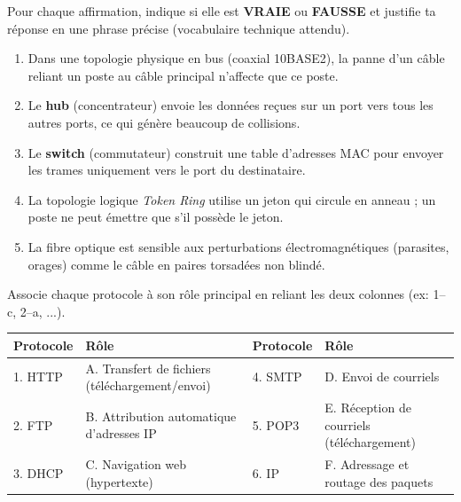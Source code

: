 \documentclass[11pt]{article}
\begin{document}
\begin{exercice}
Pour chaque affirmation, indique si elle est \textbf{VRAIE} ou \textbf{FAUSSE} et justifie ta réponse en une phrase précise (vocabulaire technique attendu).

\begin{enumerate}
    \item Dans une topologie physique en bus (coaxial 10BASE2), la panne d'un câble reliant un poste au câble principal n'affecte que ce poste.
    \item Le \textbf{hub} (concentrateur) envoie les données reçues sur un port vers tous les autres ports, ce qui génère beaucoup de collisions.
    \item Le \textbf{switch} (commutateur) construit une table d'adresses MAC pour envoyer les trames uniquement vers le port du destinataire.
    \item La topologie logique \emph{Token Ring} utilise un jeton qui circule en anneau ; un poste ne peut émettre que s'il possède le jeton.
    \item La fibre optique est sensible aux perturbations électromagnétiques (parasites, orages) comme le câble en paires torsadées non blindé.
\end{enumerate}
\end{exercice}

\begin{exercice}
Associe chaque protocole à son rôle principal en reliant les deux colonnes (ex: 1--c, 2--a, ...).

\begin{center}
\begin{tabularx}{\linewidth}{|l|X|l|X|}
\hline
\rowcolor{popblueL}
\textbf{Protocole} & \textbf{Rôle} & \textbf{Protocole} & \textbf{Rôle} \\
\hline
1. HTTP & A. Transfert de fichiers (téléchargement/envoi) & 4. SMTP & D. Envoi de courriels \\
\hline
2. FTP & B. Attribution automatique d'adresses IP & 5. POP3 & E. Réception de courriels (téléchargement) \\
\hline
3. DHCP & C. Navigation web (hypertexte) & 6. IP & F. Adressage et routage des paquets \\
\hline
\end{tabularx}
\end{center}
\end{exercice}
\end{document}
